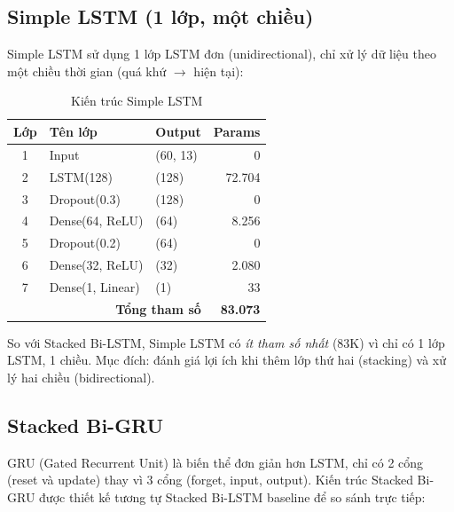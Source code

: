 \subsection{Simple LSTM (1 lớp, một chiều)}
\label{subsec:simple_lstm_model}

Simple LSTM sử dụng 1 lớp LSTM đơn (unidirectional), chỉ xử lý dữ liệu theo một chiều thời gian (quá khứ $\to$ hiện tại):

\begin{table}[H]
\centering
\caption{Kiến trúc Simple LSTM}
\label{tab:simple_lstm_architecture}
\small
\begin{tabular}{|c|l|l|r|}
\hline
\textbf{Lớp} & \textbf{Tên lớp} & \textbf{Output} & \textbf{Params} \\
\hline
1 & Input           & (60, 13)  & 0 \\
2 & LSTM(128)       & (128)     & 72.704 \\
3 & Dropout(0.3)    & (128)     & 0 \\
4 & Dense(64, ReLU) & (64)      & 8.256 \\
5 & Dropout(0.2)    & (64)      & 0 \\
6 & Dense(32, ReLU) & (32)      & 2.080 \\
7 & Dense(1, Linear) & (1)     & 33 \\
\hline
\multicolumn{3}{|r|}{\textbf{Tổng tham số}} & \textbf{83.073} \\
\hline
\end{tabular}
\end{table}

So với Stacked Bi-LSTM, Simple LSTM có \textit{ít tham số nhất} (83K) vì chỉ có 1 lớp LSTM, 1 chiều. Mục đích: đánh giá lợi ích khi thêm lớp thứ hai (stacking) và xử lý hai chiều (bidirectional).

\subsection{Stacked Bi-GRU}
\label{subsec:bigru_model}

GRU (Gated Recurrent Unit) \cite{cho2014learning} là biến thể đơn giản hơn LSTM, chỉ có 2 cổng (reset và update) thay vì 3 cổng (forget, input, output). Kiến trúc Stacked Bi-GRU được thiết kế tương tự Stacked Bi-LSTM baseline để so sánh trực tiếp:

